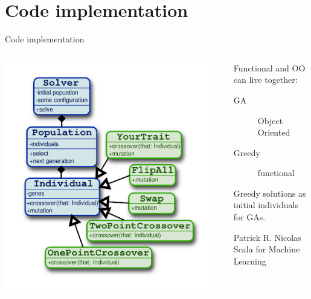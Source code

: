 \documentclass{beamer}
\begin{document}
\section{Code implementation}
\begin{frame}{Code implementation}
  \begin{columns}[onlytextwidth]
    \begin{column}{0.6\textwidth}
      \includegraphics[width=0.95\textwidth]{images/uml}
    \end{column}
    \begin{column}{0.4\textwidth}
      Functional and OO can live together:
      \begin{description}
	\item [GA] Object Oriented
	\item [Greedy] functional
      \end{description}
      Greedy solutions as initial individuals for GAs.
      \footnotesize{
	\begin{thebibliography}{99}
	   Patrick R. Nicolas
	  \newblock Scala for Machine Learning
	\end{thebibliography}
      }
    \end{column}
  \end{columns}
\end{frame}
\end{document}
